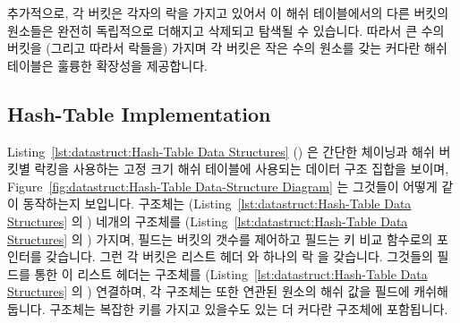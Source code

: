 추가적으로, 각 버킷은 각자의 락을 가지고 있어서 이 해쉬 테이블에서의 다른
버킷의 원소들은 완전히 독립적으로 더해지고 삭제되고 탐색될 수 있습니다.
따라서 큰 수의 버킷을 (그리고 따라서 락들을) 가지며 각 버킷은 작은 수의 원소를
갖는 커다란 해쉬 테이블은 훌륭한 확장성을 제공합니다.

\subsection{Hash-Table Implementation}
\label{sec:datastruct:Hash-Table Implementation}

\begin{fcvref}
Listing~\ref{lst:datastruct:Hash-Table Data Structures}
()
은 간단한 체이닝과 해쉬 버킷별 락킹을 사용하는 고정 크기 해쉬 테이블에 사용되는
데이터 구조 집합을 보이며,
Figure~\ref{fig:datastruct:Hash-Table Data-Structure Diagram}
는 그것들이 어떻게 같이 동작하는지 보입니다.
 구조체는
(Listing~\ref{lst:datastruct:Hash-Table Data Structures} 의
) 네개의  구조체를
(Listing~\ref{lst:datastruct:Hash-Table Data Structures} 의
) 가지며,  필드는 버킷의
갯수를 제어하고  필드는 키 비교 함수로의 포인터를 갖습니다.
그런 각 버킷은 리스트 헤더  와 하나의 락  을
갖습니다.
그것들의  필드를 통한 이 리스트 헤더는  구조체를
(Listing~\ref{lst:datastruct:Hash-Table Data Structures} 의
) 연결하며, 각  구조체는 또한 연관된
원소의 해쉬 값을  필드에 캐쉬해 둡니다.
 구조체는 복잡한 키를 가지고 있을수도 있는 더 커다란 구조체에
포함됩니다.
\end{fcvref}

\iffalse

